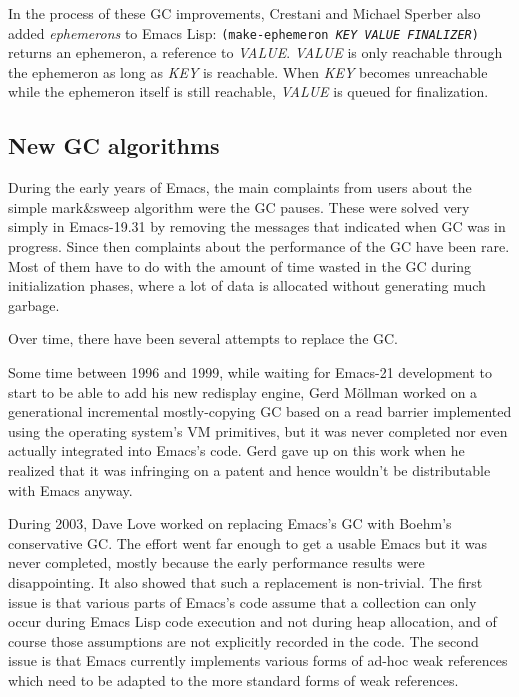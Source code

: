 \documentclass[format=acmsmall, review]{acmart}
\newcommand \Elisp {Emacs Lisp}
\newcommand \id[1] {\textrm{\textsl{#1}}}
\begin{document}
In the process of these GC improvements, Crestani and Michael Sperber
also added \emph{ephemerons} to \Elisp{}: \texttt{(make-ephemeron
  \id{KEY} \id{VALUE} \id{FINALIZER})} returns an ephemeron, a reference
to \id{VALUE}.  \id{VALUE} is only reachable through the ephemeron as
long as \id{KEY} is reachable.  When \id{KEY} becomes unreachable while
the ephemeron itself is still reachable, \id{VALUE} is queued for
finalization.

\subsection{New GC algorithms}
\label{sec:gc-algorithms}

During the early years of Emacs, the main complaints from users about the
simple mark\&sweep algorithm were the GC pauses.  These were solved very
simply in Emacs-19.31 by removing the messages that indicated when GC was in
progress.  Since then complaints about the performance of the GC have been
rare.  Most of them have to do with the amount of time wasted in the
GC during initialization phases, where a lot of data is allocated without
generating much garbage.

Over time, there have been several attempts to replace the GC.

Some time between 1996 and 1999, while waiting for Emacs-21 development to
start to be able to add his new redisplay engine, Gerd
Möllman worked on a generational incremental mostly-copying GC based on
a read barrier implemented using the operating system's VM primitives, but
it was never completed nor even actually integrated into Emacs's code.
Gerd gave up on this work when he realized that it was infringing on
a patent and hence wouldn't be distributable with Emacs anyway.

During 2003, Dave Love worked on replacing Emacs's GC with Boehm's
conservative GC.  The effort went far enough to get a usable Emacs but it
was never completed, mostly because the early performance results were
disappointing.  It also showed that such a replacement is non-trivial.
The first issue is that various parts of Emacs's code assume that
a collection can only occur during \Elisp{} code execution and not during
heap allocation, and of course those assumptions are not explicitly recorded
in the code.  The second issue is that Emacs currently implements various
forms of ad-hoc weak references which need to be adapted to the more
standard forms of weak references.
\end{document}
